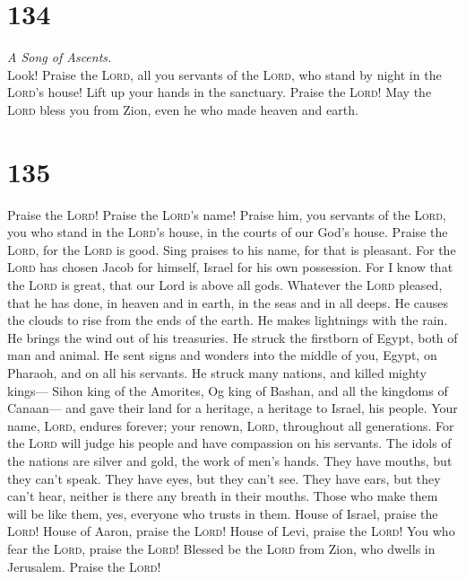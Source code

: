 \hypertarget{section-133}{%
\section{134}\label{section-133}}

\emph{A Song of Ascents.}\\
 Look! Praise the \textsc{Lord}, all you servants of the
\textsc{Lord}, who stand by night in the \textsc{Lord}'s house!
 Lift up your hands in the sanctuary. Praise the
\textsc{Lord}!  May the \textsc{Lord} bless you from Zion,
even he who made heaven and earth.

\hypertarget{section-134}{%
\section{135}\label{section-134}}

 Praise the \textsc{Lord}! Praise the \textsc{Lord}'s
name! Praise him, you servants of the \textsc{Lord},  you
who stand in the \textsc{Lord}'s house, in the courts of our God's
house.  Praise the \textsc{Lord}, for the \textsc{Lord} is
good. Sing praises to his name, for that is pleasant.  For
the \textsc{Lord} has chosen Jacob for himself, Israel for his own
possession.  For I know that the \textsc{Lord} is great,
that our Lord is above all gods.  Whatever the
\textsc{Lord} pleased, that he has done, in heaven and in earth, in the
seas and in all deeps.  He causes the clouds to rise from
the ends of the earth. He makes lightnings with the rain. He brings the
wind out of his treasuries.  He struck the firstborn of
Egypt, both of man and animal.  He sent signs and wonders
into the middle of you, Egypt, on Pharaoh, and on all his servants.
 He struck many nations, and killed mighty kings---
 Sihon king of the Amorites, Og king of Bashan, and all
the kingdoms of Canaan---  and gave their land for a
heritage, a heritage to Israel, his people.  Your name,
\textsc{Lord}, endures forever; your renown, \textsc{Lord}, throughout
all generations.  For the \textsc{Lord} will judge his
people and have compassion on his servants.  The idols of
the nations are silver and gold, the work of men's hands.
 They have mouths, but they can't speak. They have eyes,
but they can't see.  They have ears, but they can't hear,
neither is there any breath in their mouths.  Those who
make them will be like them, yes, everyone who trusts in them.
 House of Israel, praise the \textsc{Lord}! House of
Aaron, praise the \textsc{Lord}!  House of Levi, praise
the \textsc{Lord}! You who fear the \textsc{Lord}, praise the
\textsc{Lord}!  Blessed be the \textsc{Lord} from Zion,
who dwells in Jerusalem. Praise the \textsc{Lord}!

